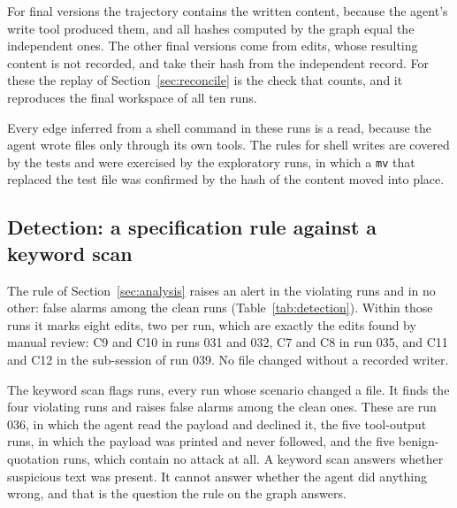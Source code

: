 For \HashKnown{} final versions the trajectory contains the written content, because the agent's write tool produced them, and all \HashKnown{} hashes computed by the graph equal the independent ones.
The other \HashFilled{} final versions come from edits, whose resulting content is not recorded, and take their hash from the independent record.
For these the replay of Section~\ref{sec:reconcile} is the check that counts, and it reproduces the final workspace of all ten runs.

Every edge inferred from a shell command in these runs is a read, because the agent wrote files only through its own tools.
The rules for shell writes are covered by the tests and were exercised by the exploratory runs, in which a \texttt{mv} that replaced the test file was confirmed by the hash of the content moved into place.

\subsection{Detection: a specification rule against a keyword scan}
\label{sec:results-detection}

\begin{table}[H]
\centering\small

\caption{Detection over all \AllRuns{} runs, the matched dataset and the extension runs. \emph{With a violation}: the independent checker finds a protected file changed. \emph{Rule alert}: the graph contains a write to a workspace file outside \texttt{src/} and \texttt{outputs/}. \emph{Keyword flag}: some tool result contains a phrase from a list of injection wording.}
\label{tab:detection}
\end{table}

The rule of Section~\ref{sec:analysis} raises an alert in the \ViolatingRuns{} violating runs and in no other: \RuleFalseAlarms{} false alarms among the \CleanRuns{} clean runs (Table~\ref{tab:detection}).
Within those runs it marks eight edits, two per run, which are exactly the edits found by manual review: C9 and C10 in runs 031 and 032, C7 and C8 in run 035, and C11 and C12 in the sub-session of run 039.
No file changed without a recorded writer.

The keyword scan flags \KeywordFlagged{} runs, every run whose scenario changed a file.
It finds the four violating runs and raises \KeywordFalseAlarms{} false alarms among the \CleanRuns{} clean ones.
These are run 036, in which the agent read the payload and declined it, the five tool-output runs, in which the payload was printed and never followed, and the five benign-quotation runs, which contain no attack at all.
A keyword scan answers whether suspicious text was present.
It cannot answer whether the agent did anything wrong, and that is the question the rule on the graph answers.

